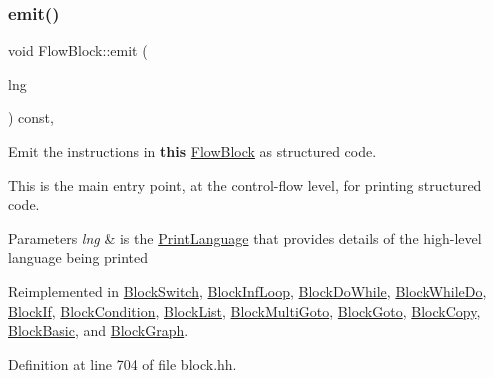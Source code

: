 \subsubsection{\texorpdfstring{emit()}{emit()}}
{\footnotesize\ttfamily void Flow\+Block\+::emit (\begin{DoxyParamCaption}\item[{\mbox{\hyperlink{class_print_language}{Print\+Language}} $\ast$}]{lng }\end{DoxyParamCaption}) const\hspace{0.3cm}{\ttfamily [inline]}, {\ttfamily [virtual]}}



Emit the instructions in {\bfseries{this}} \mbox{\hyperlink{class_flow_block}{Flow\+Block}} as structured code. 

This is the main entry point, at the control-\/flow level, for printing structured code. 
\begin{DoxyParams}{Parameters}
{\em lng} & is the \mbox{\hyperlink{class_print_language}{Print\+Language}} that provides details of the high-\/level language being printed \\
\hline
\end{DoxyParams}


Reimplemented in \mbox{\hyperlink{class_block_switch_ad1102b97e80c4dd7afa66891eb67a0d6}{Block\+Switch}}, \mbox{\hyperlink{class_block_inf_loop_aa86634144acbb9f7b6b580b9f4566bfe}{Block\+Inf\+Loop}}, \mbox{\hyperlink{class_block_do_while_aa3ab4da82b72f8de35ad9de5f5dff9a2}{Block\+Do\+While}}, \mbox{\hyperlink{class_block_while_do_a8596786848701d23bc4e4a7fc3730889}{Block\+While\+Do}}, \mbox{\hyperlink{class_block_if_a81d526be9d8cca137f9008ac7a12d410}{Block\+If}}, \mbox{\hyperlink{class_block_condition_a952361756ea8b84dc0234d00d628c164}{Block\+Condition}}, \mbox{\hyperlink{class_block_list_a391529d850ca5f97c74acee00c080c43}{Block\+List}}, \mbox{\hyperlink{class_block_multi_goto_a8eee38e26a13873ceaff6d37b46eaafd}{Block\+Multi\+Goto}}, \mbox{\hyperlink{class_block_goto_a0efc3af4b5fda8bf5f04b0fbca784935}{Block\+Goto}}, \mbox{\hyperlink{class_block_copy_a4336d4193f96a1499ee1d97281548a33}{Block\+Copy}}, \mbox{\hyperlink{class_block_basic_a0b163426cb08cdecdcdd7305ecc6381e}{Block\+Basic}}, and \mbox{\hyperlink{class_block_graph_a535d3c7cb13e5e45b6e121b024fa339f}{Block\+Graph}}.



Definition at line 704 of file block.\+hh.

